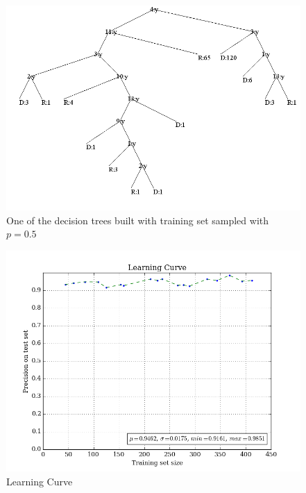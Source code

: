 \documentclass{article}
\begin{document}
\begin{figure}[H]
\centering
\includegraphics[width=400pt]{../asset/tree.png}
\caption{One of the decision trees built with training set sampled with $p = 0.5$}
\label{fig:tree}
\end{figure}

\begin{figure}[H]
\centering
\includegraphics[width=400pt]{../asset/learning-curve.png}
\caption{Learning Curve}
\label{fig:curve}
\end{figure}
\end{document}
